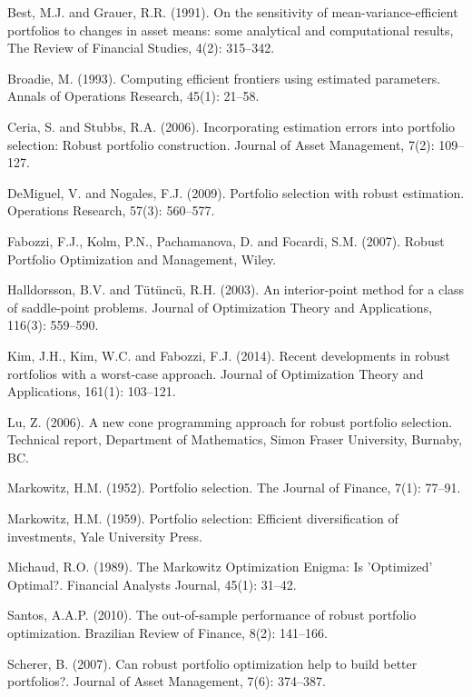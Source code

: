 \documentclass[12pt]{article}
\numberwithin{equation}{section}
\begin{document}
\begin{thebibliography}{plain}

Best, M.J. and Grauer, R.R. (1991).
On the sensitivity of mean-variance-efficient portfolios to changes in asset means: some analytical and computational results,
The Review of Financial Studies, 4(2): 315--342.

 Broadie, M. (1993).
Computing efficient frontiers using estimated parameters.
Annals of Operations Research, 45(1): 21--58.

Ceria, S. and Stubbs, R.A. (2006).
Incorporating estimation errors into portfolio selection: Robust portfolio construction.
Journal of Asset Management, 7(2): 109--127.

DeMiguel, V. and Nogales, F.J. (2009).
Portfolio selection with robust estimation.
Operations Research, 57(3): 560--577.

Fabozzi, F.J., Kolm, P.N., Pachamanova, D. and Focardi, S.M. (2007).
Robust Portfolio Optimization and Management, Wiley.

 Halldorsson, B.V. and T{\"u}t{\"u}nc{\"u}, R.H. (2003).
An interior-point method for a class of saddle-point problems.
Journal of Optimization Theory and Applications, 116(3): 559--590.

 Kim, J.H., Kim, W.C. and Fabozzi, F.J. (2014).
Recent developments in robust rortfolios with a worst-case approach.
Journal of Optimization Theory and Applications, 161(1): 103--121.

 Lu, Z. (2006).
A new cone programming approach for robust portfolio selection.
Technical report, Department of Mathematics, Simon Fraser University, Burnaby, BC.

Markowitz, H.M. (1952). Portfolio selection.
The Journal of Finance, 7(1): 77--91.

Markowitz, H.M. (1959).
Portfolio selection: Efficient diversification of investments, Yale University Press.

Michaud, R.O. (1989). The Markowitz Optimization Enigma: Is 'Optimized' Optimal?.
Financial Analysts Journal, 45(1): 31--42.

Santos, A.A.P. (2010).
The out-of-sample performance of robust portfolio optimization.
Brazilian Review of Finance, 8(2): 141--166.

 Scherer, B. (2007).
Can robust portfolio optimization help to build better portfolios?.
Journal of Asset Management, 7(6): 374--387.


\end{thebibliography}
\end{document}
